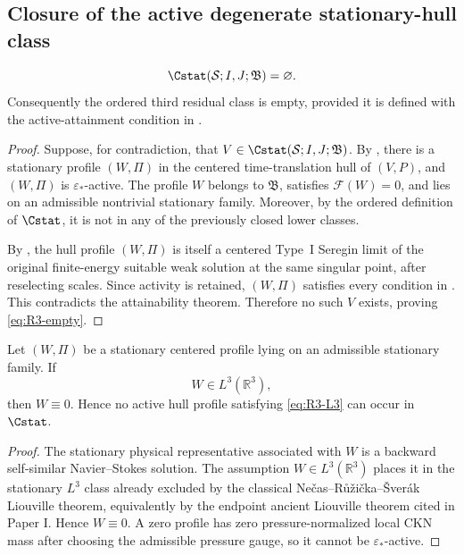 \subsection{Closure of the active degenerate stationary-hull class}

\begin{theorem}
\label{thm:R3-exclusion}
\begin{equation}\label{eq:R3-empty}
   \Cstat(\mathcal S;I,J;\mathfrak B)=\varnothing .
\end{equation}
Consequently the ordered third residual class is empty, provided it is defined
with the active-attainment condition in .
\end{theorem}

\begin{proof}
Suppose, for contradiction, that
\(V\in\Cstat(\mathcal S;I,J;\mathfrak B)\).  By
, there is a stationary profile \((W,\Pi)\) in the
centered time-translation hull of \((V,P)\), and \((W,\Pi)\) is
\(\varepsilon_*\)-active.  The profile \(W\) belongs to \(\mathfrak B\), satisfies
\(\mathcal F(W)=0\), and lies on an admissible nontrivial stationary family.
Moreover, by the ordered definition of \(\Cstat\), it is not
in any of the previously closed lower classes.

By , the hull profile \((W,\Pi)\) is itself a
centered Type~I Seregin limit of the original finite-energy suitable weak
solution at the same singular point, after reselecting scales.  Since activity
is retained, \((W,\Pi)\) satisfies every condition in
.  This contradicts the
attainability theorem.
Therefore no such \(V\) exists, proving \eqref{eq:R3-empty}.
\end{proof}

\begin{proposition}
\label{prop:R3-L3-subcase}
Let \((W,\Pi)\) be a stationary centered profile lying on an admissible
stationary family.  If
\begin{equation}\label{eq:R3-L3}
   W\in L^3(\mathbb R^3),
\end{equation}
then \(W\equiv0\).  Hence no active hull profile satisfying
\eqref{eq:R3-L3} can occur in \(\Cstat\).
\end{proposition}

\begin{proof}
The stationary physical representative associated with \(W\) is a backward
self-similar Navier--Stokes solution.  The assumption \(W\in L^3(\mathbb R^3)\)
places it in the stationary \(L^3\) class already excluded by the classical
Ne\v cas--R\r u\v zi\v cka--\v Sver\'ak Liouville theorem, equivalently by the
endpoint ancient Liouville theorem cited in Paper I.  Hence \(W\equiv0\).  A
zero profile has zero pressure-normalized local CKN mass after choosing the
admissible pressure gauge, so it cannot be \(\varepsilon_*\)-active.
\end{proof}


